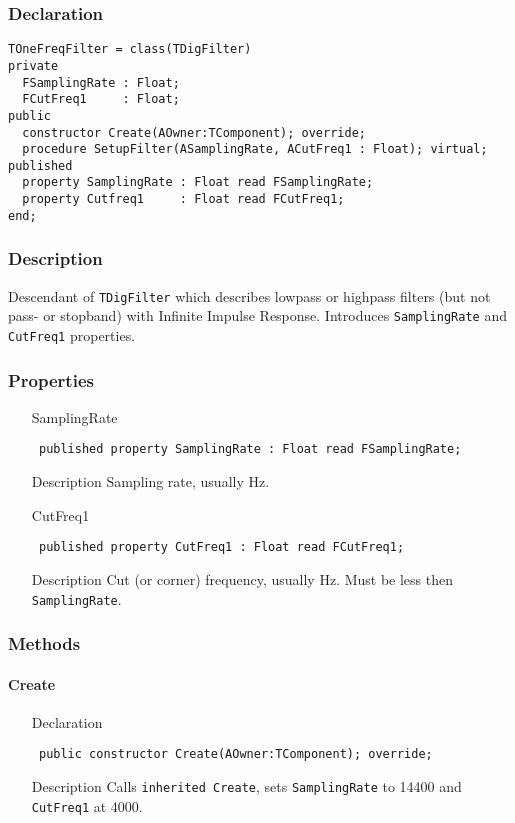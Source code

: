 \documentclass[12pt,a4paper,oneside]{report}
\newcommand{\declarationitem}[1]{{\addfontfeatures{FakeBold=1.3} #1}}
\newcommand{\descriptiontitle}[1]{{\addfontfeatures{FakeSlant}#1}}
\newcommand{\code}[1]{\texttt{#1}}
\begin{document}
\subsubsection{Declaration}
\begin{verbatim}
TOneFreqFilter = class(TDigFilter)
private
  FSamplingRate : Float;
  FCutFreq1     : Float;
public
  constructor Create(AOwner:TComponent); override;
  procedure SetupFilter(ASamplingRate, ACutFreq1 : Float); virtual;
published
  property SamplingRate : Float read FSamplingRate;
  property Cutfreq1     : Float read FCutFreq1;
end;
\end{verbatim}
\subsubsection{Description}
Descendant of \code{TDigFilter} which describes lowpass or highpass filters (but not pass- or stopband) with Infinite Impulse Response. Introduces \code{SamplingRate} and \code{CutFreq1} properties.
\subsubsection{Properties}
\begin{itemize}\label{lmfilters.TOneFreqFilter-SamplingRate}
	\item[\declarationitem{SamplingRate}\hfill]
	\begin{flushleft}
		\code{
			published property SamplingRate : Float read FSamplingRate;}
	\end{flushleft}
	\item[\descriptiontitle{Description}]
	Sampling rate, usually Hz.
	\label{lmfilters.TOneFreqFilter-Cutfreq1}
	\item[\declarationitem{CutFreq1}\hfill]
	\begin{flushleft}
		\code{
			published property CutFreq1     : Float read FCutFreq1;}
	\end{flushleft}
	\item[\descriptiontitle{Description}] Cut (or corner) frequency, usually Hz. Must be less then \code{SamplingRate}.
	\end{itemize}
\subsubsection{Methods}
\paragraph{Create}\hspace*{\fill}
\label{lmfilters.TOneFreqFilter-Create}
\begin{itemize}\item[\declarationitem{Declaration}\hfill]
	\begin{flushleft}
		\code{
			public constructor Create(AOwner:TComponent); override;}
	\end{flushleft}
\item[\descriptiontitle{Description}] Calls \code{inherited Create}, sets \code{SamplingRate} to 14400 and \code{CutFreq1} at 4000.
\end{itemize}
\end{document}
